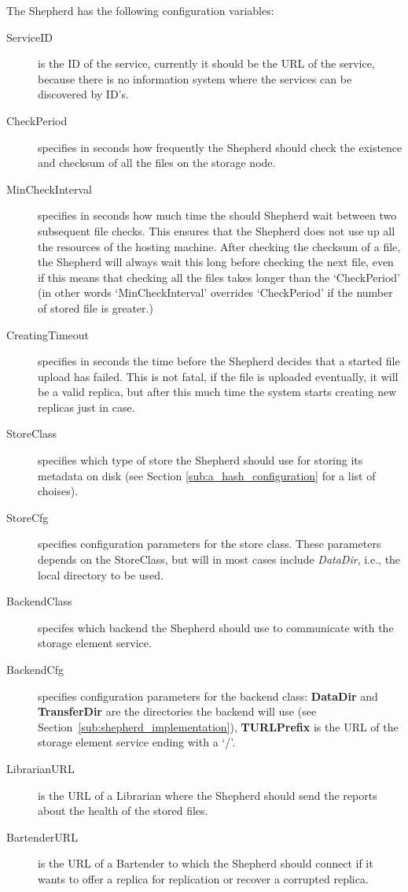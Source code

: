 \documentclass{book}
\begin{document}
The Shepherd has the following configuration variables:

\begin{description}
    \item[ServiceID] is the ID of the service, currently it should be the URL of the service, because there is no information system where the services can be discovered by ID's.
    \item[CheckPeriod] specifies in seconds how frequently the Shepherd should check the existence and checksum of all the files on the storage node.
    \item[MinCheckInterval] specifies in seconds how much time the should Shepherd wait between two subsequent file checks. This ensures that the Shepherd does not use up all the resources of the hosting machine. After checking the checksum of a file, the Shepherd will always wait this long before checking the next file, even if this means that checking all the files takes longer than the `CheckPeriod' (in other words `MinCheckInterval' overrides `CheckPeriod' if the number of stored file is greater.)
    \item[CreatingTimeout] specifies in seconds the time before the Shepherd decides that a started file upload has failed. This is not fatal, if the file is uploaded eventually, it will be a valid replica, but after this much time the system starts creating new replicas just in case.
    \item[StoreClass] specifies which type of store the Shepherd should use for storing its metadata on disk (see Section \ref{sub:a_hash_configuration} for a list of choises).
    \item[StoreCfg] specifies configuration parameters for the store class. These parameters depends on the StoreClass, but will in most cases include \emph{DataDir}, i.e., the local directory to be used.
    \item[BackendClass] specifes which backend the Shepherd should use to communicate with the storage element service.
    \item[BackendCfg] specifies configuration parameters for the backend class: \textbf{DataDir} and \textbf{TransferDir} are the directories the backend will use (see Section~\ref{sub:shepherd_implementation}), \textbf{TURLPrefix} is the URL of the storage element service ending with a `/'.
    \item[LibrarianURL] is the URL of a Librarian where the Shepherd should send the reports about the health of the stored files.
    \item[BartenderURL] is the URL of a Bartender to which the Shepherd should connect if it wants to offer a replica for replication or recover a corrupted replica.
\end{description}
\end{document}
